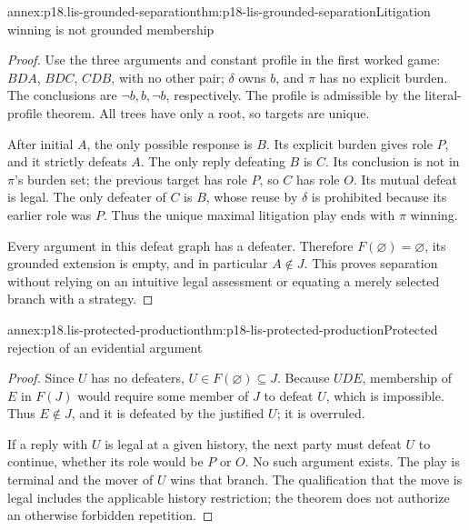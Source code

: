 \begin{annexitem}{annex:p18.lis-grounded-separation}{thm:p18-lis-grounded-separation}{Litigation winning is not grounded membership}
\begin{proof}
Use the three arguments and constant profile in the first worked
game: \(BDA\), \(BDC\), \(CDB\), with no other pair;
\(\delta\) owns \(b\), and \(\pi\) has no explicit burden.
The conclusions are \(\neg b,b,\neg b\), respectively.
The profile is admissible by the literal-profile theorem.
All trees have only a root, so targets are unique.

After initial \(A\), the only possible response is \(B\).
Its explicit burden gives role \(P\), and it strictly defeats \(A\).
The only reply defeating \(B\) is \(C\).
Its conclusion is not in \(\pi\)'s burden set; the previous
target has role \(P\), so \(C\) has role \(O\).
Its mutual defeat is legal.
The only defeater of \(C\) is \(B\), whose reuse by \(\delta\)
is prohibited because its earlier role was \(P\).
Thus the unique maximal litigation play ends with \(\pi\) winning.

Every argument in this defeat graph has a defeater.
Therefore \(F(\varnothing)=\varnothing\), its grounded extension
is empty, and in particular \(A\notin J\).
This proves separation without relying on an intuitive legal
assessment or equating a merely selected branch with a strategy.
\end{proof}
\end{annexitem}

\begin{annexitem}{annex:p18.lis-protected-production}{thm:p18-lis-protected-production}{Protected rejection of an evidential argument}
\begin{proof}
Since \(U\) has no defeaters, \(U\in F(\varnothing)\subseteq J\).
Because \(UDE\), membership of \(E\) in \(F(J)\) would require
some member of \(J\) to defeat \(U\), which is impossible.
Thus \(E\notin J\), and it is defeated by the justified \(U\);
it is overruled.

If a reply with \(U\) is legal at a given history, the next party
must defeat \(U\) to continue, whether its role would be \(P\)
or \(O\). No such argument exists. The play is terminal and
the mover of \(U\) wins that branch.
The qualification that the move is legal includes the applicable
history restriction; the theorem does not authorize an otherwise
forbidden repetition.
\end{proof}
\end{annexitem}
